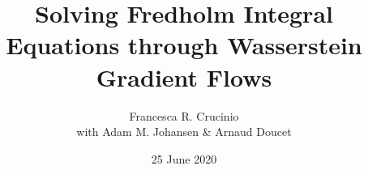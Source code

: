 \documentclass[aspectratio=149]{beamer}
\title{Solving Fredholm Integral Equations through Wasserstein Gradient Flows}
\author{Francesca R. Crucinio\\
\small{with Adam M. Johansen \& Arnaud Doucet}}
\date{25 June 2020}
\begin{document}

\begin{frame}
  \titlepage
\end{frame}


%
%

\end{document}
